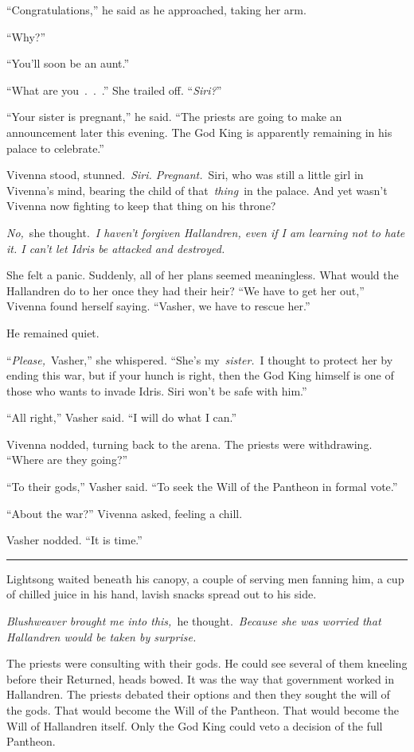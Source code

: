 “Congratulations,” he said as he approached, taking her arm.

“Why?”

“You’ll soon be an aunt.”

“What are you~.~.~.” She trailed off. “\textit{Siri?}”

“Your sister is pregnant,” he said. “The priests are going to make an announcement later this evening. The God King is apparently remaining in his palace to celebrate.”

Vivenna stood, stunned.~\textit{Siri. Pregnant.}~Siri, who was still a little girl in Vivenna’s mind, bearing the child of that~\textit{thing}~in the palace. And yet wasn’t Vivenna now fighting to keep that thing on his throne?

\textit{No,}~she thought.~\textit{I haven’t forgiven Hallandren, even if I am learning not to hate it. I can’t let Idris be attacked and destroyed.}

She felt a panic. Suddenly, all of her plans seemed meaningless. What would the Hallandren do to her once they had their heir? “We have to get her out,” Vivenna found herself saying. “Vasher, we have to rescue her.”

He remained quiet.

“\textit{Please,}~Vasher,” she whispered. “She’s my~\textit{sister.}~I thought to protect her by ending this war, but if your hunch is right, then the God King himself is one of those who wants to invade Idris. Siri won’t be safe with him.”

“All right,” Vasher said. “I will do what I can.”

Vivenna nodded, turning back to the arena. The priests were withdrawing. “Where are they going?”

“To their gods,” Vasher said. “To seek the Will of the Pantheon in formal vote.”

“About the war?” Vivenna asked, feeling a chill.

Vasher nodded. “It is time.”

\bigskip \hrule \bigskip

Lightsong waited beneath his canopy, a couple of serving men fanning him, a cup of chilled juice in his hand, lavish snacks spread out to his side.

\textit{Blushweaver brought me into this,}~he thought.~\textit{Because she was worried that Hallandren would be taken by surprise.}

The priests were consulting with their gods. He could see several of them kneeling before their Returned, heads bowed. It was the way that government worked in Hallandren. The priests debated their options and then they sought the will of the gods. That would become the Will of the Pantheon. That would become the Will of Hallandren itself. Only the God King could veto a decision of the full Pantheon.

